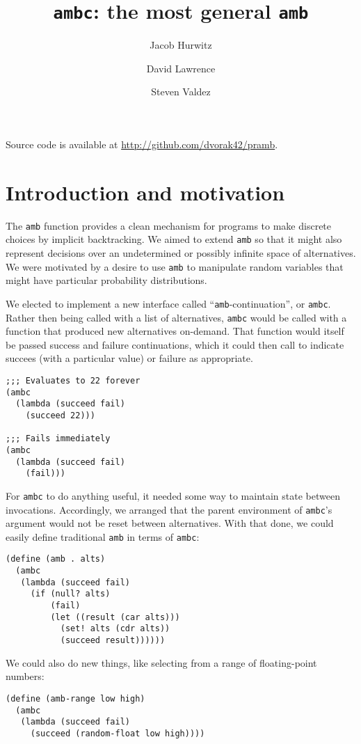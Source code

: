 \documentclass{article}
\title{\texttt{ambc}: the most general \texttt{amb}}
\author{Jacob Hurwitz \and David Lawrence \and Steven Valdez}
\begin{document}
\maketitle

\begin{center}
  Source code is available at \url{http://github.com/dvorak42/pramb}.
\end{center}

\section{Introduction and motivation}

The \texttt{amb} function provides a clean mechanism for programs to
make discrete choices by implicit backtracking.  We aimed to extend
\texttt{amb} so that it might also represent decisions over an
undetermined or possibly infinite space of alternatives.  We were
motivated by a desire to use \texttt{amb} to manipulate random
variables that might have particular probability distributions.

We elected to implement a new interface called
``\texttt{amb}-continuation'', or \texttt{ambc}.  Rather then being
called with a list of alternatives, \texttt{ambc} would be called with
a function that produced new alternatives on-demand.  That function
would itself be passed success and failure continuations, which it
could then call to indicate succees (with a particular value) or
failure as appropriate.

\begin{lstlisting}
;;; Evaluates to 22 forever
(ambc
  (lambda (succeed fail)
    (succeed 22)))

;;; Fails immediately
(ambc
  (lambda (succeed fail)
    (fail)))
\end{lstlisting}

For \texttt{ambc} to do anything useful, it needed some way to
maintain state between invocations.  Accordingly, we arranged that the
parent environment of \texttt{ambc}'s argument would not be reset
between alternatives.  With that done, we could easily define
traditional \texttt{amb} in terms of \texttt{ambc}:
\begin{lstlisting}
(define (amb . alts)
  (ambc
   (lambda (succeed fail)
     (if (null? alts)
         (fail)
         (let ((result (car alts)))
           (set! alts (cdr alts))
           (succeed result))))))
\end{lstlisting}
We could also do new things, like selecting from a range of
floating-point numbers:
\begin{lstlisting}
(define (amb-range low high)
  (ambc
   (lambda (succeed fail)
     (succeed (random-float low high))))
\end{lstlisting}
\end{document}
